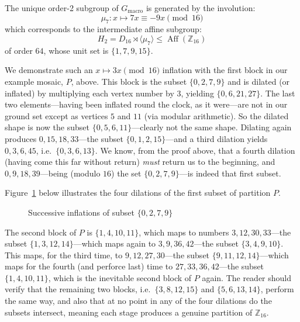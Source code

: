 The unique order-2 subgroup of $G_{\text{macro}}$ is generated by the involution:
\begin{equation}
\label{eqn:mu7-involution}
\mu_7 \colon x \mapsto 7x \equiv -9x \pmod{16}
\end{equation}
which corresponds to the intermediate affine subgroup:
\begin{equation}
\label{eqn:h2-subgroup}
H_2 = D_{16} \rtimes \langle \mu_7 \rangle \le \operatorname{Aff}(\mathbb{Z}_{16})
\end{equation}
of order $64$, whose unit set is $\{1, 7, 9, 15\}$.

We demonstrate such an $x \mapsto 3x \pmod{16}$ inflation with the first block in our example mosaic, $P$, above. This block is the subset $\{0, 2, 7, 9\}$ and is dilated (or inflated) by multiplying each vertex number by $3$, yielding $\{0, 6, 21, 27\}$. The last two elements---having been inflated round the clock, as it were---are not in our ground set except as vertices $5$ and $11$ (via modular arithmetic). So the dilated shape is now the subset $\{0, 5, 6, 11\}$---clearly not the same shape. Dilating again produces $0, 15, 18, 33$---the subset $\{0, 1, 2, 15\}$---and a third dilation yields $0, 3, 6, 45$, i.e.\ $\{0, 3, 6, 13\}$. We know, from the proof above, that a fourth dilation (having come this far without return) \textit{must} return us to the beginning, and $0, 9, 18, 39$---being (modulo $16$) the set $\{0, 2, 7, 9\}$---is indeed that first subset.

Figure~\ref{fig:inflation-in-action} below illustrates the four dilations of the first subset of partition $P$.

\begin{figure}[htbp]
\centering

\caption{\label{fig:inflation-in-action}Successive inflations of subset $\{0, 2, 7, 9\}$}
\end{figure}

The second block of $P$ is $\{1, 4, 10, 11\}$, which maps to numbers $3, 12, 30, 33$---the subset $\{1, 3, 12, 14\}$---which maps again to $3, 9, 36, 42$---the subset $\{3, 4, 9, 10\}$. This maps, for the third time, to $9, 12, 27, 30$---the subset $\{9, 11, 12, 14\}$---which maps for the fourth (and perforce last) time to $27, 33, 36, 42$---the subset $\{1, 4, 10, 11\}$, which is the inevitable second block of $P$ again. The reader should verify that the remaining two blocks, i.e.\ $\{3, 8, 12, 15\}$ and $\{5, 6, 13, 14\}$, perform the same way, and also that at no point in any of the four dilations do the subsets intersect, meaning each stage produces a genuine partition of $\mathbb{Z}_{16}$.

